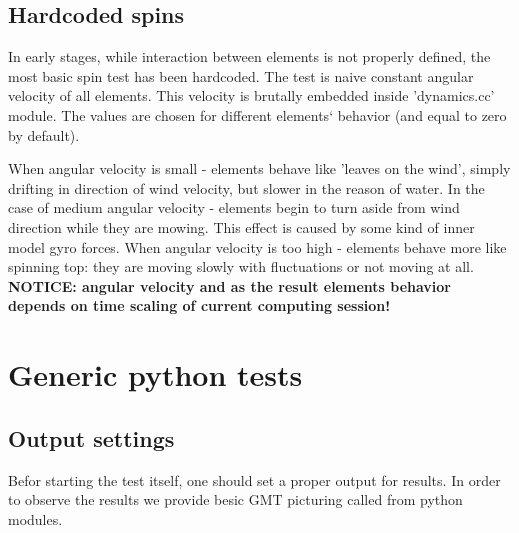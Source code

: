 \subsection{Hardcoded spins}

In early stages, while interaction between elements is not properly 
defined, the most basic spin test has been hardcoded. The test is naive 
constant angular velocity of all elements. This velocity is brutally 
embedded inside 'dynamics.cc' module. The values are chosen for different
elements` behavior (and equal to zero by default). 

When angular velocity is small - elements behave like 'leaves on the wind',
simply drifting in direction of wind velocity, but slower in the reason 
of water. 
In the case of medium angular velocity - elements begin to turn aside from
wind direction while they are mowing. This effect is caused by some 
kind of inner model gyro forces.
When angular velocity is too high - elements behave more like spinning top:
they are moving slowly with fluctuations or not moving at all.
\textbf{NOTICE: angular velocity and as the result elements behavior 
depends on time scaling of current computing session!}


\section{Generic python tests}

\subsection{Output settings}

Befor starting the test itself, one should set a proper output for results.
In order to observe the results we provide besic GMT picturing called from 
python modules.

